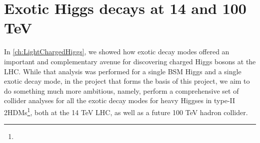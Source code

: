\chapter{Exotic Higgs decays at 14 and 100 TeV}\label{ch:ExoticHiggs}

In \autoref{ch:LightChargedHiggs}, we showed how exotic decay modes offered an important and complementary avenue for discovering charged Higgs bosons at the LHC. While that analysis was performed for a single BSM Higgs and a single exotic decay mode, in the project that forms the basis of this project, we aim to do something much more ambitious, namely, perform a comprehensive set of collider analyses for all the exotic decay modes for heavy Higgses in type-II 2HDMs\footnote{}, both at the 14 TeV LHC, as well as a future 100 TeV hadron collider.

